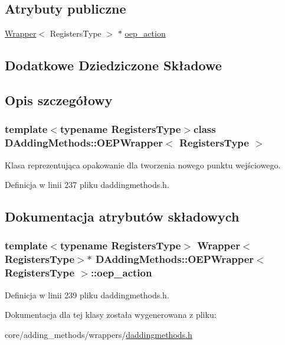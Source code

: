 \subsection*{Atrybuty publiczne}
\begin{DoxyCompactItemize}
\item 
\hyperlink{class_d_adding_methods_1_1_wrapper}{Wrapper}$<$ Registers\-Type $>$ $\ast$ \hyperlink{class_d_adding_methods_1_1_o_e_p_wrapper_ae954eddc8e8916ad5b78b1a10a9dab64}{oep\-\_\-action}
\end{DoxyCompactItemize}
\subsection*{Dodatkowe Dziedziczone Składowe}


\subsection{Opis szczegółowy}
\subsubsection*{template$<$typename Registers\-Type$>$class D\-Adding\-Methods\-::\-O\-E\-P\-Wrapper$<$ Registers\-Type $>$}

Klasa reprezentująca opakowanie dla tworzenia nowego punktu wejściowego. 

Definicja w linii 237 pliku daddingmethods.\-h.



\subsection{Dokumentacja atrybutów składowych}
\hypertarget{class_d_adding_methods_1_1_o_e_p_wrapper_ae954eddc8e8916ad5b78b1a10a9dab64}{
\subsubsection[{oep\-\_\-action}]{\setlength{\rightskip}{0pt plus 5cm}template$<$typename Registers\-Type$>$ {\bf Wrapper}$<$Registers\-Type$>$$\ast$ {\bf D\-Adding\-Methods\-::\-O\-E\-P\-Wrapper}$<$ Registers\-Type $>$\-::oep\-\_\-action}}\label{class_d_adding_methods_1_1_o_e_p_wrapper_ae954eddc8e8916ad5b78b1a10a9dab64}


Definicja w linii 239 pliku daddingmethods.\-h.



Dokumentacja dla tej klasy została wygenerowana z pliku\-:\begin{DoxyCompactItemize}
\item 
core/adding\-\_\-methods/wrappers/\hyperlink{daddingmethods_8h}{daddingmethods.\-h}\end{DoxyCompactItemize}
